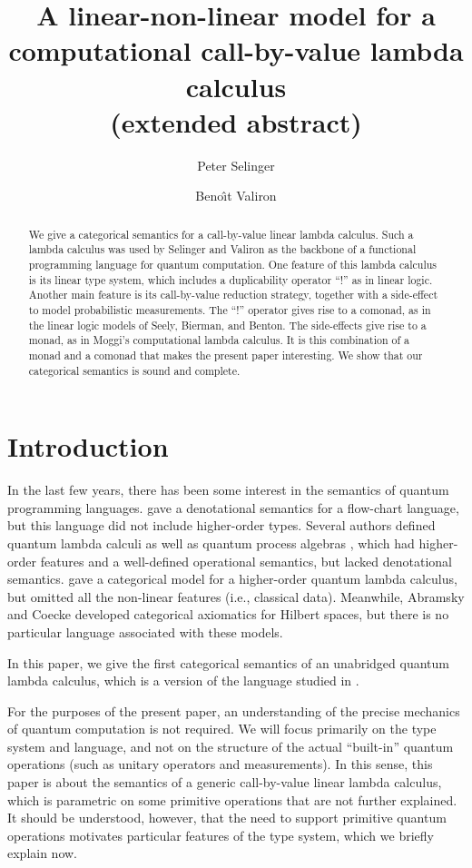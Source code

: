 \documentclass{llncs}
\title{A linear-non-linear model for a computational call-by-value lambda calculus\\(extended abstract)}
\author{Peter Selinger\inst{1} \and Beno\^{\i}t Valiron\inst{2}}
\institute{
  Dalhousie University,
  \email{selinger@mathstat.dal.ca}
  \and
  University of Ottawa,
  \email{bvali087@uottawa.ca}
}
\begin{document}
\maketitle

\begin{abstract}
  We give a categorical semantics for a call-by-value linear lambda
  calculus. Such a lambda calculus was used by Selinger and Valiron as
  the backbone of a functional programming language for quantum
  computation. One feature of this lambda calculus is its linear type system,
  which includes a duplicability operator ``$!$'' as in linear logic.
  Another main feature is its call-by-value reduction strategy,
  together with a side-effect to model probabilistic measurements. The
  ``$!$'' operator gives rise to a comonad, as in the linear logic
  models of Seely, Bierman, and Benton. The side-effects give rise to
  a monad, as in Moggi's computational lambda calculus.  It is this
  combination of a monad and a comonad that makes the present paper
  interesting. We show that our categorical semantics is sound and
  complete.
\end{abstract}



\section{Introduction}

In the last few years, there has been some interest in the semantics
of quantum programming languages.
{\cite{selinger04quantum}} gave a denotational
semantics for a flow-chart language, but this language did not include
higher-order types. Several authors defined quantum lambda calculi
{\cite{tonder04lambda,selinger05lambda}} as well as quantum process
algebras {\cite{GaySJ:comqp,LalJor}}, which had higher-order features
and a well-defined operational semantics, but lacked denotational
semantics. \cite{valiron06fully} gave a categorical model for a
higher-order quantum lambda calculus, but omitted all the non-linear
features (i.e., classical data).  Meanwhile, Abramsky and Coecke
{\cite{abramsky04categorical,coecke04informationflow}}
developed categorical axiomatics for Hilbert spaces, but there is
no particular language associated with these models.

In this paper, we give the first categorical semantics of an
unabridged quantum lambda calculus, which is a version of the language
studied in {\cite{selinger05lambda}}. 

For the purposes of the present paper, an understanding of the precise
mechanics of quantum computation is not required. We will focus
primarily on the type system and language, and not on the structure of
the actual ``built-in'' quantum operations (such as unitary operators
and measurements). In this sense, this paper is about the semantics of
a generic call-by-value linear lambda calculus, which is parametric on
some primitive operations that are not further explained. It should be
understood, however, that the need to support primitive quantum
operations motivates particular features of the type system, which we
briefly explain now.
\end{document}
